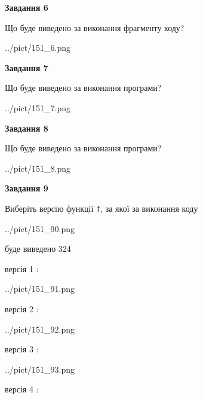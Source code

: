 \documentclass[12pt, ukrainian]{article}
\def\code#1{\Verb!#1!}
\begin{document}
{\begin {large}
{\begin {center}\textbf{Завдання 6}\end {center}}

Що буде виведено за виконання фрагменту коду?\par
\begin{center}
	{../pict/151_6.png}
\end{center}
\newpage

{\begin {center}\textbf{Завдання 7}\end {center}}

Що буде виведено за виконання програми?\par
\begin{center}
	{../pict/151_7.png}
\end{center}
\newpage

{\begin {center}\textbf{Завдання 8}\end {center}}

Що буде виведено за виконання програми?\par
\begin{center}
	{../pict/151_8.png}
\end{center}
\newpage

{\begin {center}\textbf{Завдання 9}\end {center}}

Виберіть версію функції \code{f}, за якої за виконання коду
\begin{center}
	{../pict/151_90.png}
\end{center}
буде виведено 324

\vspace{5mm}
версія 1 :

\begin{center}
	{../pict/151_91.png}
\end{center}
версія 2 :

\begin{center}
	{../pict/151_92.png}
\end{center}
версія 3 :

\begin{center}
	{../pict/151_93.png}
\end{center}
версія 4 :


\end{large}}
\end{document}
